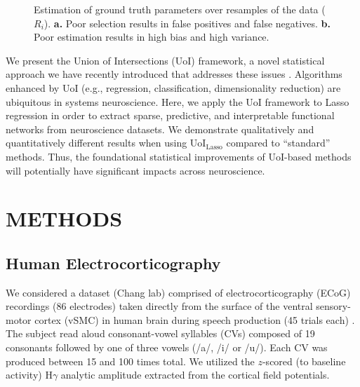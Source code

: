 \documentclass[letterpaper, 10 pt, conference]{ieeeconf}  %
\begin{document}
\begin{figure}[b]
    \vspace{-15pt}
    \centering
    \vspace{-20pt}
    \caption{Estimation of ground truth parameters over resamples of the data ($R_i$). \textbf{a.} Poor selection results in false positives and false negatives. \textbf{b.} Poor estimation results in high bias and high variance.}
    \label{fig:intro}
\end{figure}

We present the Union of Intersections (UoI) framework, a novel statistical approach we have recently introduced that addresses these issues \cite{uoi}. Algorithms enhanced by UoI (e.g., regression, classification, dimensionality reduction) are ubiquitous in systems neuroscience. Here, we apply the UoI framework to Lasso regression in order to extract sparse, predictive, and interpretable functional networks from neuroscience datasets. We demonstrate qualitatively and quantitatively different results when using UoI$_{\text{Lasso}}$  compared to ``standard'' methods.  Thus, the foundational statistical improvements of UoI-based methods will potentially have significant impacts across neuroscience.

\section{METHODS}
\subsection{Human Electrocorticography}
We considered a dataset (Chang lab) comprised of electrocorticography (ECoG) recordings (86 electrodes) taken directly from the surface of the ventral sensory-motor cortex (vSMC) in human brain during speech production (45 trials each) \cite{bouchard2013}. The subject read aloud consonant-vowel syllables (CVs) composed of 19 consonants followed by one of three vowels (/a/, /i/ or /u/). Each CV was produced between 15 and 100 times total.  We utilized the $z$-scored (to baseline activity) H$\gamma$ analytic amplitude extracted from the cortical field potentials.
\end{document}
